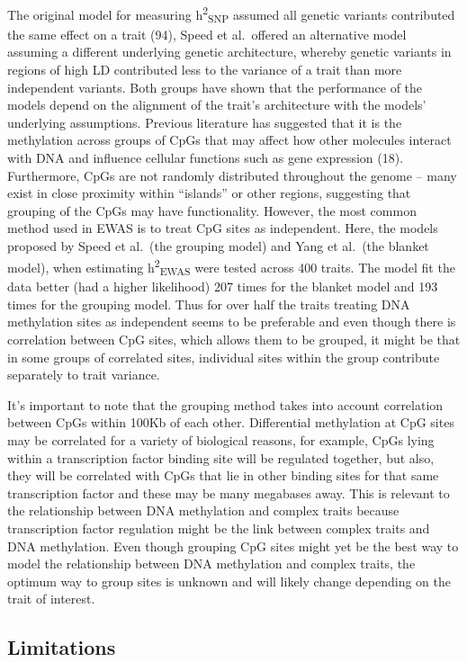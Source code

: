 \documentclass[11pt,oneside]{bristolthesis}
\begin{document}
The original model for measuring h\textsuperscript{2}\textsubscript{SNP} assumed all genetic variants contributed the same effect on a trait (94), Speed et al.~offered an alternative model assuming a different underlying genetic architecture, whereby genetic variants in regions of high LD contributed less to the variance of a trait than more independent variants. Both groups have shown that the performance of the models depend on the alignment of the trait's architecture with the models' underlying assumptions. Previous literature has suggested that it is the methylation across groups of CpGs that may affect how other molecules interact with DNA and influence cellular functions such as gene expression (18). Furthermore, CpGs are not randomly distributed throughout the genome -- many exist in close proximity within ``islands'' or other regions, suggesting that grouping of the CpGs may have functionality. However, the most common method used in EWAS is to treat CpG sites as independent. Here, the models proposed by Speed et al.~(the grouping model) and Yang et al.~(the blanket model), when estimating h\textsuperscript{2}\textsubscript{EWAS} were tested across 400 traits. The model fit the data better (had a higher likelihood) 207 times for the blanket model and 193 times for the grouping model. Thus for over half the traits treating DNA methylation sites as independent seems to be preferable and even though there is correlation between CpG sites, which allows them to be grouped, it might be that in some groups of correlated sites, individual sites within the group contribute separately to trait variance.

It's important to note that the grouping method takes into account correlation between CpGs within 100Kb of each other. Differential methylation at CpG sites may be correlated for a variety of biological reasons, for example, CpGs lying within a transcription factor binding site will be regulated together, but also, they will be correlated with CpGs that lie in other binding sites for that same transcription factor and these may be many megabases away. This is relevant to the relationship between DNA methylation and complex traits because transcription factor regulation might be the link between complex traits and DNA methylation. Even though grouping CpG sites might yet be the best way to model the relationship between DNA methylation and complex traits, the optimum way to group sites is unknown and will likely change depending on the trait of interest.

\hypertarget{limitations-05}{%
\subsection{Limitations}\label{limitations-05}}
\end{document}
